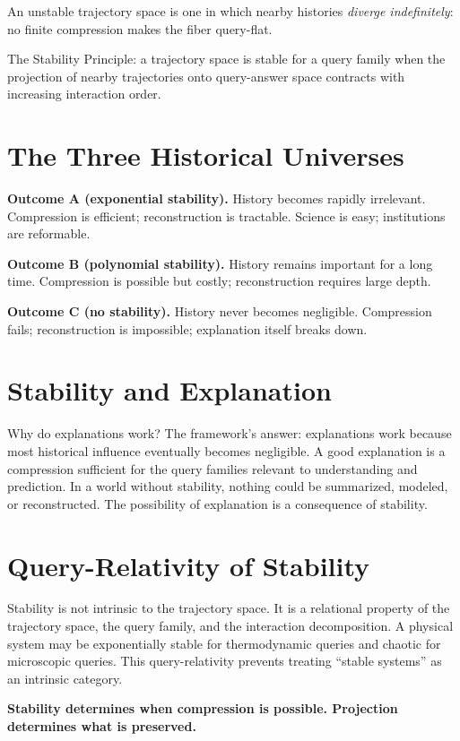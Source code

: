 An unstable trajectory space is one in which nearby histories \emph{diverge indefinitely}: no finite compression makes the fiber query-flat.

The Stability Principle: a trajectory space is stable for a query family when the projection of nearby trajectories onto query-answer space contracts with increasing interaction order.

\section{The Three Historical Universes}

\textbf{Outcome A (exponential stability).} History becomes rapidly irrelevant. Compression is efficient; reconstruction is tractable. Science is easy; institutions are reformable.

\textbf{Outcome B (polynomial stability).} History remains important for a long time. Compression is possible but costly; reconstruction requires large depth.

\textbf{Outcome C (no stability).} History never becomes negligible. Compression fails; reconstruction is impossible; explanation itself breaks down.

\section{Stability and Explanation}

Why do explanations work? The framework's answer: explanations work because most historical influence eventually becomes negligible. A good explanation is a compression sufficient for the query families relevant to understanding and prediction. In a world without stability, nothing could be summarized, modeled, or reconstructed. The possibility of explanation is a consequence of stability.

\section{Query-Relativity of Stability}

Stability is not intrinsic to the trajectory space. It is a relational property of the trajectory space, the query family, and the interaction decomposition. A physical system may be exponentially stable for thermodynamic queries and chaotic for microscopic queries. This query-relativity prevents treating ``stable systems'' as an intrinsic category.

\textbf{Stability determines when compression is possible. Projection determines what is preserved.}
